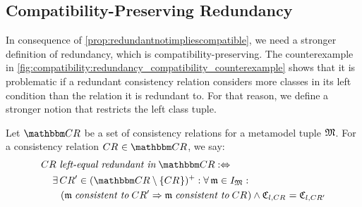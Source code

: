 \subsection{Compatibility-Preserving Redundancy}

In consequence of \autoref{prop:redundantnotimpliescompatible}, we need a stronger definition of redundancy, which is compatibility-preserving. 
The counterexample in \autoref{fig:compatibility:redundancy_compatibility_counterexample} shows that it is problematic if a redundant consistency relation considers more classes in its left condition than the relation it is redundant to.
For that reason, we define a stronger notion that restricts the left class tuple.

\begin{definition} \label{def:leftequalredundancy}
    Let $\consistencyrelationset{CR}$ be a set of consistency relations for a metamodel tuple $\metamodeltuple{M}$.
    For a consistency relation $\consistencyrelation{CR}{} \in \consistencyrelationset{CR}$, we say:
    \begin{align*}
        &
        \consistencyrelation{CR}{} \leftequalredundantinmath \consistencyrelationset{CR} \equivalentperdefinition \\
        & \formulaskip 
        \exists \consistencyrelation{CR}{}' \in \transitiveclosure{(\consistencyrelationset{CR} \setminus \setted{\consistencyrelation{CR}{}})} : 
        \forall \modeltuple{m} \in \metamodeltupleinstanceset{M} :\\
        & \formulaskip\formulaskip
        (\modeltuple{m} \consistenttomath \consistencyrelation{CR}{}' \Rightarrow \modeltuple{m} \consistenttomath \consistencyrelation{CR}{}) %
        \land \classtuple{C}{l,\consistencyrelation{CR}{}} = \classtuple{C}{l,\consistencyrelation{CR}{}'}
    \end{align*}
\end{definition}

